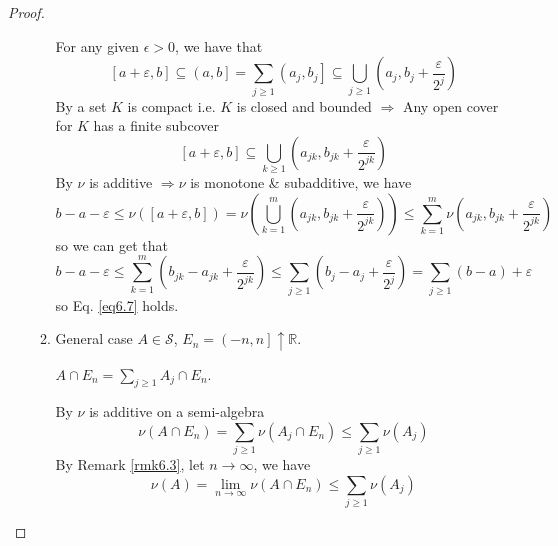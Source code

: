 \begin{proof}
\begin{enumerate}
\begin{enumerate}
			For any given $ \epsilon >0 $, we have that
			\begin{equation}
			\left[ {a + \varepsilon ,b} \right] \subseteq \left( {a,b} \right] = \sum\limits_{j \geqslant 1} {\left( {{a_j},{b_j}} \right]}  \subseteq \bigcup\limits_{j \geqslant 1} {\left( {{a_j},{b_j} + \frac{\varepsilon }{{{2^j}}}} \right)} 
			\label{eq6.8}
			\end{equation}
			By  a set $ K $ is compact i.e. $ K $ is closed and bounded  $ \Rightarrow $ Any open cover for $ K $ has a finite subcover
			\begin{equation}
			\left[ {a + \varepsilon ,b} \right] \subseteq \bigcup\limits_{k \geqslant 1} {\left( {{a_{jk}},{b_{jk}} + \frac{\varepsilon }{{{2^{jk}}}}} \right)} 
			\label{eq6.9}
			\end{equation}
			By  $ \nu $ is additive $ \Rightarrow \nu $ is monotone \& subadditive, we have
			\begin{equation}
			b - a - \varepsilon  \leqslant \nu \left( {\left[ {a + \varepsilon ,b} \right]} \right) = \nu \left( {\bigcup\limits_{k = 1}^m {\left( {{a_{jk}},{b_{jk}} + \frac{\varepsilon }{{{2^{jk}}}}} \right)} } \right) \leqslant \sum\limits_{k = 1}^m {\nu \left( {{a_{jk}},{b_{jk}} + \frac{\varepsilon }{{{2^{jk}}}}} \right)} 
			\label{eq6.10}
			\end{equation}
			so we can get that
			\begin{equation}
			b - a - \varepsilon  \leqslant \sum\limits_{k = 1}^m {\left( {{b_{jk}} - {a_{jk}} + \frac{\varepsilon }{{{2^{jk}}}}} \right)}  \leqslant \sum\limits_{j \geqslant 1} {\left( {{b_j} - {a_j} + \frac{\varepsilon }{{{2^j}}}} \right)}  = \sum\limits_{j \geqslant 1} {\left( {b - a} \right)}  + \varepsilon 
			\label{eq6.11}
			\end{equation}
			so Eq. \ref{eq6.7} holds.
			\item General case $ A \in \mathcal{S} $, ${E_n} = \left( { - n,n} \right] \uparrow \mathbb{R}$.
			
			$A \cap {E_n} = \sum\limits_{j \geqslant 1} {{A_j} \cap {E_n}} $.
			
			By $ \nu $ is additive on a semi-algebra
			\begin{equation}
			\nu \left( {A \cap {E_n}} \right) = \sum\limits_{j \geqslant 1} {\nu \left( {{A_j} \cap {E_n}} \right)}  \leqslant \sum\limits_{j \geqslant 1} {\nu \left( {{A_j}} \right)} 
			\label{eq6.12}
			\end{equation}
			By Remark \ref{rmk6.3}, let $ n \to \infty $, we have
			\begin{equation}
			\nu \left( A \right) = \mathop {\lim }\limits_{n \to \infty } \nu \left( {A \cap {E_n}} \right) \leqslant \sum\limits_{j \geqslant 1} {\nu \left( {{A_j}} \right)}
			\label{eq6.13} 
			\end{equation}
		\end{enumerate}
	\end{enumerate}
\end{proof}

